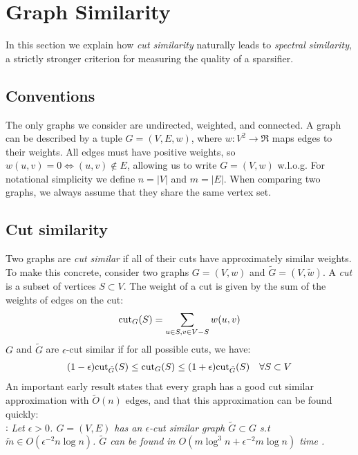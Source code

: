 \documentclass{article}
\begin{document}
\section{Graph Similarity}

In this section we explain how \textit{cut similarity} naturally leads to
\textit{spectral similarity}, a strictly stronger criterion for measuring
the quality of a sparsifier. 

\subsection{Conventions}

The only graphs we consider are undirected, weighted, and connected. A graph
can be described by a tuple $G = (V, E, w)$, where $w : V^2 \rightarrow \Re$
maps edges to their weights. All edges must have positive weights, so $w(u,
v) = 0 \Leftrightarrow (u, v) \not\in E$, allowing us to write $G = (V, w)$
w.l.o.g. For notational simplicity we define $n = |V|$ and $m = |E|$. When
comparing two graphs, we always assume that they share the same vertex set.

\subsection{Cut similarity}

Two graphs are \textit{cut similar} if all of their cuts have approximately
similar weights. To make this concrete, consider two graphs $G = (V, w)$ and
$\tilde{G} = (V, \tilde{w})$. A \textit{cut} is a subset of vertices $S
\subset V$.  The weight of a cut is given by the sum of the weights of edges
on the cut:
\begin{align*}
    \text{cut}_{G}(S) = \sum_{u \in S, v \in V - S} w(u, v)
\end{align*}
$G$ and $\tilde{G}$ are $\epsilon$-cut similar if for all possible cuts, we
have:
\begin{align*}
    (1 - \epsilon)\text{cut}_{\tilde{G}}(S) \leq \text{cut}_{G}(S) \leq (1 +
    \epsilon)\text{cut}_{\tilde{G}}(S) \quad \forall{S \subset V}
\end{align*}
An important early result states that every graph has a good cut similar
approximation with $\tilde{O}(n)$ edges, and that this approximation can be
found quickly: \\

\noindent
{}: \textit{Let $\epsilon > 0$. $G =
(V, E)$ has an $\epsilon$-cut similar graph $\tilde{G} \subset G$ s.t
$\tilde{m} \in O(\epsilon^{-2}n\log n)$. $\tilde{G}$ can be found in
$O(m\log^3n + \epsilon^{-2}m\log n)$ time \cite{BenczurKarger}.} \\
\end{document}
